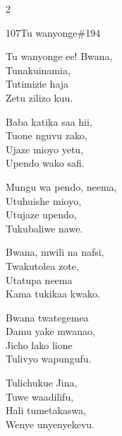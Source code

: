\documentclass{article}
\begin{document}
\begin{multicols}{2}
\begin{hymn}{107}{Tu wanyonge}{\#194}
\begin{stanza}
Tu wanyonge ee! Bwana,\\
Tunakuinamia,\\
Tutimizie haja\\
Zetu zilizo kuu.
\end{stanza}
\begin{chorus}
Baba katika saa hii,\\
Tuone nguvu zako,\\
Ujaze mioyo yetu,\\
Upendo wako safi.
\end{chorus}
\begin{stanza}
Mungu wa pendo, neema,\\
Utuhuishe mioyo,\\
Utujaze upendo,\\
Tukubaliwe nawe.
\end{stanza}
\begin{stanza}
Bwana, mwili na nafsi,\\
Twakutolea zote,\\
Utatupa neema\\
Kama tukikaa kwako.
\end{stanza}
\begin{stanza}
Bwana twategemea\\
Damu yake mwanao,\\
Jicho lako lione\\
Tulivyo wapungufu.
\end{stanza}
\begin{stanza}
Tulichukue Jina,\\
Tuwe waadilifu,\\
Hali tumetakaswa,\\
Wenye unyenyekevu.
\end{stanza}
\end{hymn}


\end{multicols}
\end{document}
